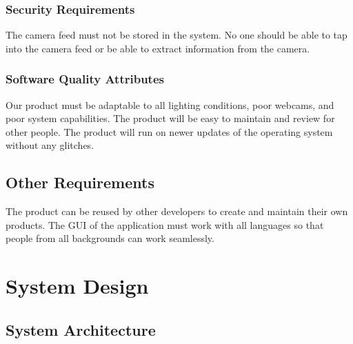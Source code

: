 \documentclass[11pt]{report}
\begin{document}
\subsection{Security Requirements}
The camera feed must not be stored in the system. No one should be able to tap into the camera feed or be able to extract information from the camera.

\subsection{Software Quality Attributes}

Our product must be adaptable to all lighting conditions, poor webcams, and poor system capabilities. The product will be easy to maintain and review for other people. The  product will run on newer updates of the operating system without any glitches.

\section{Other Requirements}
The product can be reused by other developers to create and maintain their own products. The GUI of the application must work with all languages so that people from all backgrounds can work seamlessly. 




\chapter{System Design}
\section{System Architecture}
\end{document}
